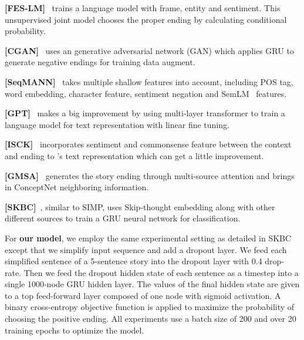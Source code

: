 \textbf{[FES-LM]}~\cite{peng2017joint} trains a language model with frame, 
entity and sentiment. This unsupervised joint model chooses the proper ending by 
calculating conditional probability.

\textbf{[CGAN]}~\cite{wang2017conditional} uses an generative adversarial 
network (GAN) which applies GRU to generate negative endings for 
training data augment.

\textbf{[SeqMANN]}~\cite{li2018multi} takes multiple shallow features into account, 
including POS tag, word embedding, character feature, 
sentiment negation and SemLM~\cite{peng2016two} features.

\textbf{[GPT]}~\cite{radford2018improving} makes a big improvement by using 
multi-layer transformer to train a language model for text representation 
with linear fine tuning.

\textbf{[ISCK]}~\cite{chen2018incorporating} incorporates  sentiment and 
commonsense feature between the context and ending to 
\citeauthor{radford2018improving}'s text representation which can get a little improvement.

\textbf{[GMSA]}~\cite{guan2018story} generates the story ending through 
multi-source attention and brings in ConceptNet neighboring information.


\textbf{[SKBC]}~\cite{roemmele2017rnn}, similar to SIMP, uses Skip-thought 
embedding along with other different sources to train a GRU neural network 
for classification.


For {\bf our model}, we employ the same experimental 
setting as detailed in SKBC 
except that we simplify input sequence and  add a dropout layer. 
We feed each simplified sentence of  a 5-sentence story into the dropout layer with 0.4 drop-rate. 
Then we feed the dropout hidden state of each sentence 
as a timestep into a single 1000-node GRU hidden layer.
The values of the final hidden state are given to a top feed-forward layer composed of 
one node with sigmoid activation. A binary cross-entropy objective function is applied 
to maximize the probability of choosing the positive ending. 
All experiments use a batch size of 
200 and over 20 training epochs to optimize the model. 

